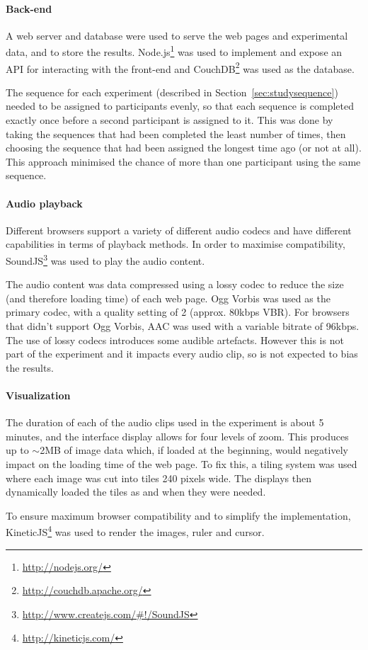 \paragraph{Back-end}
A web server and database were used to serve the web pages and experimental
data, and to store the results. Node.js\footnote{\url{http://nodejs.org/}} was
used to implement and expose an API for interacting with the front-end and
CouchDB\footnote{\url{http://couchdb.apache.org/}} was used as the database.

The sequence for each experiment (described in Section~\ref{sec:studysequence})
needed to be assigned to participants evenly, so that each sequence is
completed exactly once before a second participant is assigned to it. This was
done by taking the sequences that had been completed the least number of times,
then choosing the sequence that had been assigned the longest time ago (or not
at all). This approach minimised the chance of more than one participant using
the same sequence. 

\paragraph{Audio playback}
Different browsers support a variety of different audio codecs and have
different capabilities in terms of playback methods. In order to maximise
compatibility, SoundJS\footnote{\url{http://www.createjs.com/\#!/SoundJS}} was
used to play the audio content.

The audio content was data compressed using a lossy codec to reduce the size
(and therefore loading time) of each web page. Ogg Vorbis was used as the
primary codec, with a quality setting of 2 (approx. 80kbps VBR). For browsers
that didn't support Ogg Vorbis, AAC was used with a variable bitrate of 96kbps.
The use of lossy codecs introduces some audible artefacts. However this is not
part of the experiment and it impacts every audio clip, so is not expected to
bias the results. 

\paragraph{Visualization}
The duration of each of the audio clips used in the experiment is about 5
minutes, and the interface display allows for four levels of zoom. This
produces up to $\sim$2MB of image data which, if loaded at the beginning, would
negatively impact on the loading time of the web page. To fix this, a tiling
system was used where each image was cut into tiles 240 pixels wide. The
displays then dynamically loaded the tiles as and when they were needed.

To ensure maximum browser compatibility and to simplify the implementation,
KineticJS\footnote{\url{http://kineticjs.com/}} was used to render the images,
ruler and cursor.

